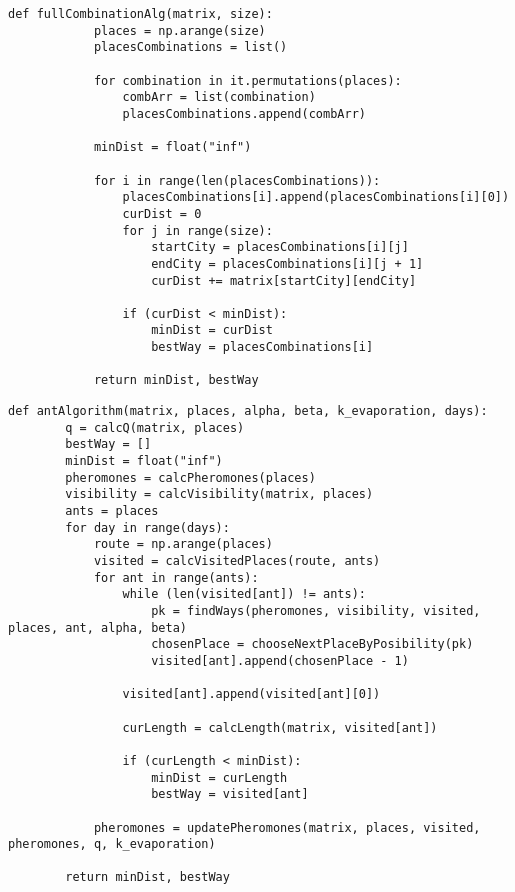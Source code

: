 \begin{center}
	\captionsetup{justification=raggedright,singlelinecheck=off}
	\begin{lstlisting}[label=lst:full_comb,caption=Алгоритм полного перебора путей]
		def fullCombinationAlg(matrix, size):
			places = np.arange(size)
			placesCombinations = list()
			
			for combination in it.permutations(places):
				combArr = list(combination)
				placesCombinations.append(combArr)
			
			minDist = float("inf")
			
			for i in range(len(placesCombinations)):
				placesCombinations[i].append(placesCombinations[i][0])
				curDist = 0
				for j in range(size):
					startCity = placesCombinations[i][j]
					endCity = placesCombinations[i][j + 1]
					curDist += matrix[startCity][endCity]
				
				if (curDist < minDist):
					minDist = curDist
					bestWay = placesCombinations[i]
			
			return minDist, bestWay
	\end{lstlisting}
\end{center}

\clearpage

\begin{center}
	\captionsetup{justification=raggedright,singlelinecheck=off}
	\begin{lstlisting}[label=lst:ant_alg,caption=Муравьиный алгоритм]
	def antAlgorithm(matrix, places, alpha, beta, k_evaporation, days):
		q = calcQ(matrix, places)
		bestWay = []
		minDist = float("inf")
		pheromones = calcPheromones(places)
		visibility = calcVisibility(matrix, places)
		ants = places
		for day in range(days):
			route = np.arange(places)
			visited = calcVisitedPlaces(route, ants)
			for ant in range(ants):
				while (len(visited[ant]) != ants):
					pk = findWays(pheromones, visibility, visited, places, ant, alpha, beta)
					chosenPlace = chooseNextPlaceByPosibility(pk)
					visited[ant].append(chosenPlace - 1)
				
				visited[ant].append(visited[ant][0])
				
				curLength = calcLength(matrix, visited[ant])
				
				if (curLength < minDist):
					minDist = curLength
					bestWay = visited[ant]
				
			pheromones = updatePheromones(matrix, places, visited, pheromones, q, k_evaporation)
		
		return minDist, bestWay
	\end{lstlisting}
\end{center}


